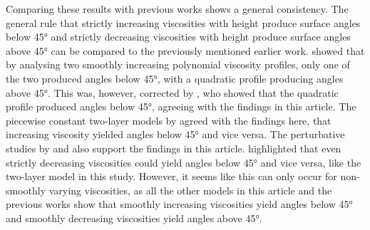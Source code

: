 Comparing these results with previous works shows a general consistency. The general rule that strictly increasing viscosities with height produce surface angles below \ang{45} and strictly decreasing viscosities with height produce surface angles above \ang{45} can be compared to the previously mentioned earlier work. \citet{ionescu-kruse2021} showed that by analysing two smoothly increasing polynomial viscosity profiles, only one of the two produced angles below \ang{45}, with a quadratic profile producing angles above \ang{45}. This was, however, corrected by \citet{guan2023}, who showed that the quadratic profile produced angles below \ang{45}, agreeing with the findings in this article. The piecewise constant two-layer models by \citet{dritschel2020} agreed with the findings here, that increasing viscosity yielded angles below \ang{45} and vice versa. The perturbative studies by \citet{bressan2019} and \citet{constantin2021} also support the findings in this article. \citet{constantin2021} highlighted that even strictly decreasing viscosities could yield angles below \ang{45} and vice versa, like the two-layer model in this study. However, it seems like this can only occur for non-smoothly varying viscosities, as all the other models in this article and the previous works show that smoothly increasing viscosities yield angles below \ang{45} and smoothly decreasing viscosities yield angles above \ang{45}.

